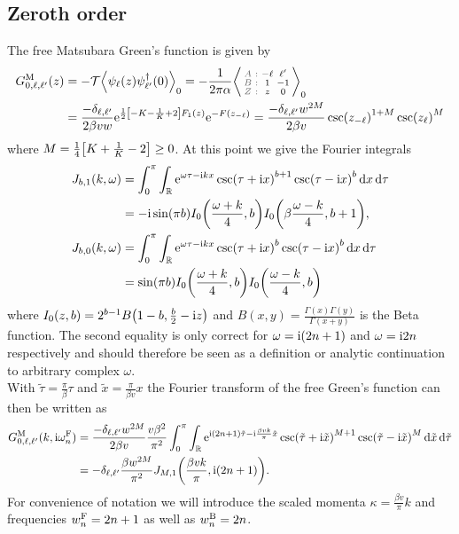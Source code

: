 \documentclass[english, parskip=full]{scrartcl}
\begin{document}
\subsection{Zeroth order}
The free Matsubara Green's function is given by
\begin{align}
G_{0,\ell,\ell'}^\M(z) &= -\mathcal{T} \bra*{\psi_\ell(z) \psi_{\ell'}^\dagger(0)}_0 = -\frac{1}{2\pi \alpha} \bra*{\zabx{-\ell & \ell'}{1 & -1}{z & 0}}_0\\
&= \frac{-\delta_{\ell,\ell'}}{2\beta v w} \powe{\frac{1}{2}\klb*{-K - \frac{1}{K} + 2}F_1(z)} \powe{-F\kla*{z_{-\ell}}} = \frac{-\delta_{\ell,\ell'}w^{2M}}{2\beta v}  \csc(z_{-\ell})^{1 + M} \csc(z_\ell)^M
\end{align}
where $M=\frac{1}{4} \klb*{K + \frac{1}{K} - 2} \ge 0$.
At this point we give the Fourier integrals
\begin{align}
J_{b,1}(k,\omega) &= \intx{0}{\pi}{\intr{\powe{\omega\tau - \i kx} \csc(\tau +\i x)^{b+1} \csc(\tau - \i x)^b}{x} }{\tau}\\
&= -\i\sin(\pi b) I_0\kla*{\frac{\omega + k}{4}, b} I_0\kla*{\beta\frac{\omega - k}{4}, b+1},\\
J_{b,0}(k,\omega) &= \intx{0}{\pi}{\intr{\powe{\omega \tau - \i kx} \csc(\tau+\i x)^{b} \csc(\tau - \i x)^b}{x} }{\tau}\\
&= \sin(\pi b) I_0\kla*{\frac{\omega + k}{4}, b} I_0\kla*{\frac{\omega - k}{4}, b}
\end{align}
where $I_0(z,b) = 2^{b-1} B\kla*{1-b, \frac{b}{2} - \i z}$ and $B(x,y)=\frac{\Gamma(x)\Gamma(y)}{\Gamma(x+y)}$ is the Beta function.
The second equality is only correct for $\omega=\text{i} (2n+1)$ and $\omega=\text{i} 2n$ respectively and should therefore be seen as a definition or analytic continuation to arbitrary complex $\omega$.\\
With $\tilde{\tau} = \frac{\pi}{\beta}\tau$ and $\tilde{x} = \frac{\pi}{\beta v}x$ the Fourier transform of the free Green's function can then be written as
\begin{align}
G^\M_{0,\ell,\ell'}(k,\i\omega_n^\F) &= \frac{-\delta_{\ell,\ell'} w^{2M}}{2\beta v} \frac{v\beta^2}{\pi^2} \intx{0}{\pi}{\intr{\powe{\i (2n+1)\tilde{\tau} - \i \frac{\beta vk}{\pi} \tilde{x}} \csc(\tilde{\tau} +\i \tilde{x})^{M+1} \csc(\tilde{\tau} - \i \tilde{x})^M}{\tilde{x}} }{\tilde{\tau}}\\
&= -\delta_{\ell,\ell'} \frac{\beta w^{2M}}{\pi^2} J_{M,1}\kla*{\frac{\beta vk}{\pi}, \i (2n+1)}.
\end{align}
For convenience of notation we will introduce the scaled momenta $\kappa = \frac{\beta v}{\pi}k$ and frequencies $w_n^{\text{F}} = 2n+1$ as well as $w_n^{\text{B}} = 2n$.
\end{document}

